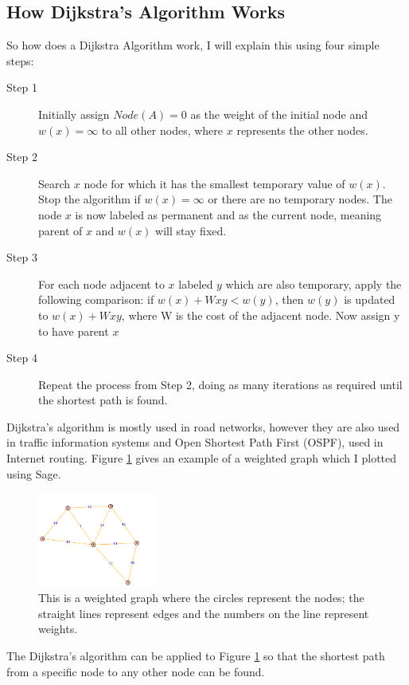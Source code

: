 \documentclass[a4paper]{article}
\begin{document}
\subsection{How Dijkstra's Algorithm Works}
So how does a Dijkstra Algorithm work, I will explain this using four simple steps:
\begin{description}
\item [Step 1]
Initially assign $Node(A) = 0$ as the weight of the initial node and $w(x) = \infty$ to all other nodes, where $x$ represents the other nodes.
\item[Step 2]
Search $x$ node for which it has the smallest temporary value of $w(x)$. Stop the algorithm if $w(x) = \infty$ or there are no temporary nodes. The node $x$ is now labeled as permanent and as the current node, meaning parent of $x$ and $w(x)$ will stay fixed.   
\item[Step 3]
For each node adjacent to $x$ labeled $y$ which are also temporary, apply the following comparison: 
if $w(x) + Wxy < w(y)$, then $w(y)$ is updated to $w(x) + Wxy$, where W is the cost of the adjacent node. Now assign y to have parent $x$
\item[Step 4]
Repeat the process from Step 2, doing as many iterations as required until the shortest path is found. 
\end{description}

Dijkstra's algorithm is mostly used in road networks, however they are also used in traffic information systems and Open Shortest Path First (OSPF), used in Internet routing. Figure \ref{fig:Weighted_Graph} gives an example of a weighted graph which I plotted using Sage.  

\begin{figure}[ht]
\centering
\includegraphics[width=0.35\textwidth]{Weighted_Graph1.pdf}
\caption{\label{fig:Weighted_Graph}This is a weighted graph where the circles represent the nodes; the straight lines represent edges and the numbers on the line represent weights.}
\end{figure}

The Dijkstra's algorithm can be applied to Figure \ref{fig:Weighted_Graph} so that the shortest path from a specific node to any other node can be found.
\end{document}
